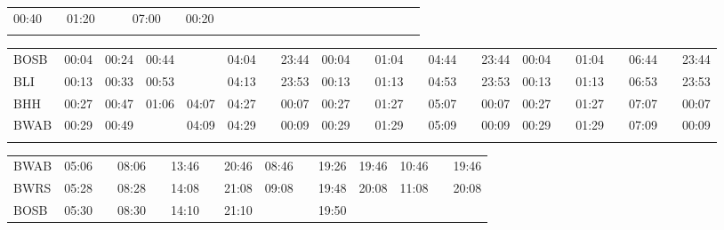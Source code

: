 \begin{center}
\begin{tabular}
\begin{tabular}
\begin{tabular}{!{\color{blaulilas}\vrule width 3pt}l!{\color{blaulilas}\vrule width 3pt}*{6}{c|}c!{\color{blaulilas}\vrule width 3pt}*{2}{*{7}{c|}c!{\color{blaulilas}\vrule width 3pt}}}
00:40 & \bls{}   & 01:20 &       &          & 07:00 & \bls{}   & 00:20 \\
\myhline
\end{tabular}
\begin{tabular}{!{\color{blaulilas}\vrule width 3pt}l!{\color{blaulilas}\vrule width 3pt}*{3}{*{6}{c|}c!{\color{blaulilas}\vrule width 3pt}}}
\hline
{}
 &  &  \\
\hline
BOSB     &
00:04 & 00:24 & 00:44 &       & 04:04 &  & 23:44 &
00:04 &  & 01:04 &          & 04:44 &  & 23:44 &
00:04 &  & 01:04 &          & 06:44 &  & 23:44 \\
BLI      &
00:13 & 00:33 & 00:53 &       & 04:13 & \bls{}   & 23:53 &
00:13 & \bls{}   & 01:13 &  & 04:53 & \bls{}   & 23:53 &
00:13 & \bls{}   & 01:13 &  & 06:53 & \bls{}   & 23:53 \\
BHH      &
00:27 & 00:47 & 01:06 & 04:07 & 04:27 & \bls{}   & 00:07 &
00:27 & \bls{}   & 01:27 & \bls{}   & 05:07 & \bls{}   & 00:07 &
00:27 & \bls{}   & 01:27 & \bls{}   & 07:07 & \bls{}   & 00:07 \\
BWAB     &
00:29 & 00:49 &       & 04:09 & 04:29 & \bls{}   & 00:09 &
00:29 & \bls{}   & 01:29 & \bls{}   & 05:09 & \bls{}   & 00:09 &
00:29 & \bls{}   & 01:29 & \bls{}   & 07:09 & \bls{}   & 00:09 \\
\myhline
\end{tabular}
\fi
\iftapir
\begin{tabular}{!{\color{blaulilas}\vrule width 3pt}l!{\color{blaulilas}\vrule width 3pt}*{6}{c|}c!{\color{blaulilas}\vrule width 3pt}*{3}{c|}c!{\color{blaulilas}\vrule width 3pt}*{2}{c|}c!{\color{blaulilas}\vrule width 3pt}}
\hline
{}
 &  &  \\
\hline
BWAB     &
05:06 &  & 08:06 &  & 13:46 &  & 20:46 &
08:46 &  & 19:26 & 19:46 &
10:46 &  & 19:46 \\
BWRS     &
05:28 & \bls{}   & 08:28 & \bls{}   & 14:08 & \bls{}   & 21:08 &
09:08 & \bls{}   & 19:48 & 20:08 &
11:08 & \bls{}   & 20:08 \\
BOSB     &
05:30 & \bls{}   & 08:30 &          & 14:10 & \bls{}   & 21:10 &
      &          & 19:50 &       &
      &          &       \\

\end{tabular}
\end{tabular}
\end{tabular}
\end{center}

